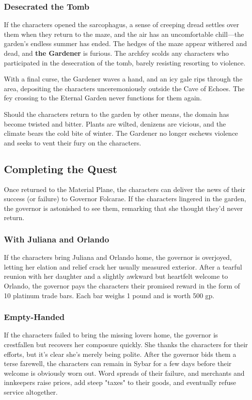\documentclass[10pt,a4paper,twoside,bg=print,twocolumn,openany,nodeprecatedcode]{dndbook}
\begin{document}
\subsubsection{Desecrated the Tomb}
If the characters opened the sarcophagus, a sense of creeping dread settles over them when they return to the maze, and the air has an uncomfortable chill—the garden's endless summer has ended. The hedges of the maze appear withered and dead, and \textbf{the Gardener} is furious. The archfey scolds any characters who participated in the desecration of the tomb, barely resisting resorting to violence.

With a final curse, the Gardener waves a hand, and an icy gale rips through the area, depositing the characters unceremoniously outside the Cave of Echoes. The fey crossing to the Eternal Garden never functions for them again.

Should the characters return to the garden by other means, the domain has become twisted and bitter. Plants are wilted, denizens are vicious, and the climate bears the cold bite of winter. The Gardener no longer eschews violence and seeks to vent their fury on the characters.

\subsection{Completing the Quest}
Once returned to the Material Plane, the characters can deliver the news of their success (or failure) to Governor Folcarae. If the characters lingered in the garden, the governor is astonished to see them, remarking that she thought they'd never return.

\subsubsection{With Juliana and Orlando}
If the characters bring Juliana and Orlando home, the governor is overjoyed, letting her elation and relief crack her usually measured exterior. After a tearful reunion with her daughter and a slightly awkward but heartfelt welcome to Orlando, the governor pays the characters their promised reward in the form of 10 platinum trade bars. Each bar weighs 1 pound and is worth 500 gp.

\subsubsection{Empty-Handed}
If the characters failed to bring the missing lovers home, the governor is crestfallen but recovers her composure quickly. She thanks the characters for their efforts, but it's clear she's merely being polite. After the governor bids them a terse farewell, the characters can remain in Sybar for a few days before their welcome is obviously worn out. Word spreads of their failure, and merchants and innkeepers raise prices, add steep "taxes" to their goods, and eventually refuse service altogether.
\end{document}
